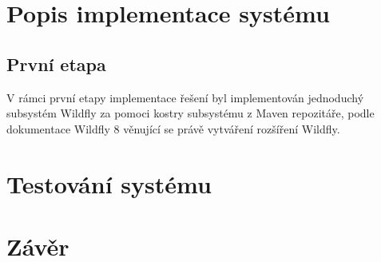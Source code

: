 \chapter{Popis implementace systému}

\section{První etapa}

V rámci první etapy implementace řešení byl implementován jednoduchý subsystém Wildfly za pomoci kostry subsystému z Maven repozitáře, podle dokumentace Wildfly 8 věnující se právě vytváření rozšíření Wildfly. \cite{wildflyExtending}



\chapter{Testování systému}


\chapter{Závěr}





